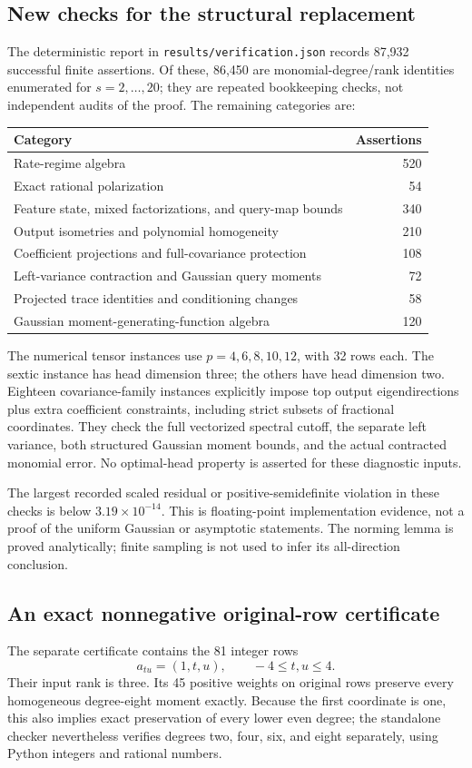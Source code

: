 \documentclass[11pt]{article}
\theoremstyle{remark}\newtheorem{remark}[theorem]{Remark}
\begin{document}
\subsection{New checks for the structural replacement}
The deterministic report in \texttt{results/verification.json} records 87,932 successful finite assertions. Of these, 86,450 are monomial-degree/rank identities enumerated for $s=2,\ldots,20$; they are repeated bookkeeping checks, not independent audits of the proof. The remaining categories are:
\begin{center}
\begin{tabular}{lr}
\toprule
Category & Assertions\\
\midrule
Rate-regime algebra & 520\\
Exact rational polarization & 54\\
Feature state, mixed factorizations, and query-map bounds & 340\\
Output isometries and polynomial homogeneity & 210\\
Coefficient projections and full-covariance protection & 108\\
Left-variance contraction and Gaussian query moments & 72\\
Projected trace identities and conditioning changes & 58\\
Gaussian moment-generating-function algebra & 120\\
\bottomrule
\end{tabular}
\end{center}
The numerical tensor instances use $p=4,6,8,10,12$, with 32 rows each. The sextic instance has head dimension three; the others have head dimension two. Eighteen covariance-family instances explicitly impose top output eigendirections plus extra coefficient constraints, including strict subsets of fractional coordinates. They check the full vectorized spectral cutoff, the separate left variance, both structured Gaussian moment bounds, and the actual contracted monomial error. No optimal-head property is asserted for these diagnostic inputs.

The largest recorded scaled residual or positive-semidefinite violation in these checks is below $3.19\times10^{-14}$. This is floating-point implementation evidence, not a proof of the uniform Gaussian or asymptotic statements. The norming lemma is proved analytically; finite sampling is not used to infer its all-direction conclusion.

\subsection{An exact nonnegative original-row certificate}
The separate certificate contains the 81 integer rows
\[
 a_{tu}=(1,t,u),\qquad -4\le t,u\le4.
\]
Their input rank is three. Its 45 positive weights on original rows preserve every homogeneous degree-eight moment exactly. Because the first coordinate is one, this also implies exact preservation of every lower even degree; the standalone checker nevertheless verifies degrees two, four, six, and eight separately, using Python integers and rational numbers.
\end{document}
